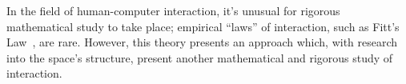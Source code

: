 In the field of human-computer interaction, it's unusual for rigorous mathematical study to take place; empirical ``laws'' of interaction, such as Fitt's Law~\citep{fitts1954information}, are rare. However, this theory presents an approach which, with research into the space's structure, present another mathematical and rigorous study of interaction.

